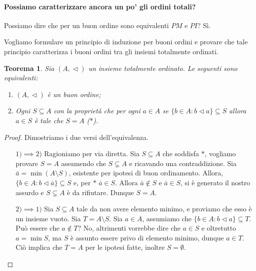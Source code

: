 \documentclass[fontsize = 11 pt, paper=A4, oneside, index=totoc, hyperref]{article}
\theoremstyle{definition}
\theoremstyle{plain}
\newtheorem{thm}{Teorema}[section]
\newcommand{\order}{\vartriangleleft}
\begin{document}
\paragraph{Possiamo caratterizzare ancora un po' gli ordini totali?} Possiamo dire che per un buon ordine sono equivalenti \(PM\) e \(PI\)? Sì.

Vogliamo formulare un principio di induzione per buoni ordini e provare che tale principio caratterizza i buoni ordini tra gli insiemi totalmente ordinati.
\begin{thm}
  Sia \((A,\order)\) un insieme totalmente ordinato. Le seguenti sono equivalenti:
  \begin{enumerate}
    \item \((A,\order)\) è un buon ordine;
    \item Ogni \(S \subseteq A\) con la proprietà che per ogni \(a \in A\) se \(\lbrace b \in A \colon b \order a\rbrace \subseteq S\) allora \(a \in S\) è tale che \(S = A\) (\(*\)).
  \end{enumerate}
\end{thm}
\begin{proof} Dimostriamo i due versi dell'equivalenza.
  \begin{itemize}
    \item[\(1) \implies 2)\)] Ragioniamo per via diretta. Sia \(S \subseteq A\) che soddisfa \(*\), vogliamo provare \(S = A\) assumendo che \(S \subsetneq A\) e ricavando una contraddizione. Sia \(\bar{a} = \min (A \setminus S)\), esistente per ipotesi di buon ordinamento. Allora, \(\lbrace b \in A \colon b \order \bar{a} \rbrace \subseteq S\) e, per \(*\) \(\bar{a} \in S\). Allora \(\bar{a} \notin S\) e \(\bar{a} \in S\), si è generato il nostro assurdo e \(S \subsetneq A\) è da rifiutare. Dunque \(S = A\).
    \item[\(2) \implies 1)\)] Sia \(S \subseteq A\) tale da non avere elemento minimo, e proviamo che esso è un insieme vuoto. Sia \(T = A \setminus S\). Sia \(a \in A\), assumiamo che \(\lbrace b \in A \colon b \order a \rbrace \subseteq T\). Può essere che \(a \notin T\)? No, altrimenti vorrebbe dire che \(a \in S\) e oltretutto \(a = \min S\), ma \(S\) è assunto essere privo di elemento minimo, dunque \(a \in T\). Ciò implica che \(T = A\) per le ipotesi fatte, inoltre \(S = \emptyset\).
  \end{itemize}
\end{proof}
\end{document}
